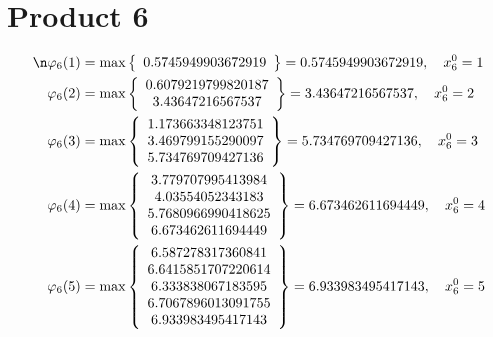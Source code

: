 \documentclass{article}
\begin{document}
\section{Product 6}
\begin{align*}
\n  
  
\varphi_{6}(1) &= \max \left\{ \begin{array}{c}
0.5745949903672919
\end{array} \right\} = 0.5745949903672919, \quad x_{6}^0 = 1\\
  
  
  
  
\varphi_{6}(2) &= \max \left\{ \begin{array}{c}
0.6079219799820187 \\
 3.43647216567537
\end{array} \right\} = 3.43647216567537, \quad x_{6}^0 = 2\\
  
  
  
  
\varphi_{6}(3) &= \max \left\{ \begin{array}{c}
1.173663348123751 \\
 3.469799155290097 \\
 5.734769709427136
\end{array} \right\} = 5.734769709427136, \quad x_{6}^0 = 3\\
  
  
  
  
\varphi_{6}(4) &= \max \left\{ \begin{array}{c}
3.779707995413984 \\
 4.03554052343183 \\
 5.7680966990418625 \\
 6.673462611694449
\end{array} \right\} = 6.673462611694449, \quad x_{6}^0 = 4\\
  
  
  
  
\varphi_{6}(5) &= \max \left\{ \begin{array}{c}
6.587278317360841 \\
 6.6415851707220614 \\
 6.333838067183595 \\
 6.7067896013091755 \\
 6.933983495417143
\end{array} \right\} = 6.933983495417143, \quad x_{6}^0 = 5\\
  
  
  

\end{align*}
\end{document}
